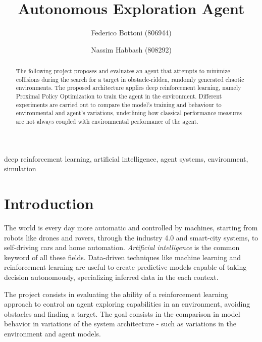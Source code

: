 \documentclass{ifacconf}
\begin{document}
\begin{frontmatter}

\title{Autonomous Exploration Agent} 

\author{Federico Bottoni (806944)}
\author{Nassim Habbash (808292)}

\address{Complex Systems and Artificial Intelligence courses project\\for the MSc in CS at University of Milano-Bicocca \\ 
(e-mails: f.bottoni1@campus.unimib.it,\\
n.habbash@campus.unimib.it).}

\begin{abstract}
The following project proposes and evaluates an agent that attempts to minimize collisions during the search for a target in obstacle-ridden, randomly generated chaotic environments. The proposed architecture applies deep reinforcement learning, namely Proximal Policy Optimization to train the agent in the environment. Different experiments are carried out to compare the model's training and behaviour to environmental and agent's variations, underlining how classical performance measures are not always coupled with environmental performance of the agent.
\end{abstract}

\begin{keyword}
deep reinforcement learning, artificial intelligence, agent systems, environment, simulation
\end{keyword}
\end{frontmatter}

\section{Introduction}
The world is every day more automatic and controlled by machines, starting from robots like drones and rovers, through the industry 4.0 and smart-city systems, to self-driving cars and home automation. \emph{Artificial intelligence} is the common keyword of all these fields. Data-driven techniques like machine learning and reinforcement learning are useful to create predictive models capable of taking decision autonomously, specializing inferred data in the each context. 

The project consists in evaluating the ability of a reinforcement learning approach to control an agent exploring capabilities in an environment, avoiding obstacles and finding a target. The goal consists in the comparison in model behavior in variations of the system architecture - such as variations in the environment and agent models.
\citep{paper}
\end{document}

